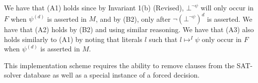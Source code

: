 \documentclass{llncs}
\begin{document}
We have that (A1) holds since by Invariant 1(b) (Revised), $\bot^{\neg \psi}$ will only occur in $F$ when $\psi^{(d)}$ is asserted in $M$, and by (B2), only after $\neg (\bot^{\neg \psi})^d$ is asserted.
We have that (A2) holds by (B2) and using similar reasoning.
We have that (A3) also holds similarly to (A1) by noting that literals $l$ such that $l \mapsto^I \psi$ only occur in $F$ when $\psi^{(d)}$ is asserted in $M$.

This implementation scheme requires the ability to remove clauses from the SAT-solver database as well as a special instance of a forced decision.

\begin{comment}
\subsection{Via Controlling Decisions}

\noindent (C1) For a quantified formula $\psi$, maintain a set $L^\psi$ of literals $l_1, \ldots l_n, \bot^{\neg \psi} \in F$ such that $l_i \mapsto^I \psi$, $1 \leq i \leq n$, \\
(C2) When $\psi \not\in M$, mark literals, \\
(C3)
(C4) When $\psi^{(d)}$ is asserted to $M$, assert $\neg (\bot^{\neg \psi})^d$, \\
\end{comment}
\end{document}
